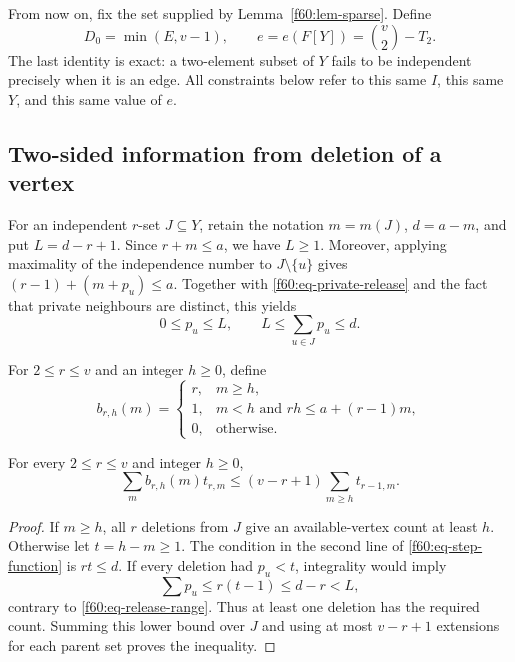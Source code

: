 From now on, fix the set supplied by Lemma~\ref{f60:lem-sparse}.  Define
\begin{equation}
 D_0=\min(E,v-1),\qquad e=e(F[Y])=\binom v2-T_2.
 \label{f60:eq-actual-edges}
\end{equation}
The last identity is exact: a two-element subset of $Y$ fails to be
independent precisely when it is an edge.  All constraints below refer
to this same $I$, this same $Y$, and this same value of $e$.

\subsection{Two-sided information from deletion of a vertex}
\label{f60:subsec-two-sided}

For an independent $r$-set $J\subseteq Y$, retain the notation
$m=m(J)$, $d=a-m$, and put $L=d-r+1$.  Since $r+m\le a$, we have
$L\ge1$.  Moreover, applying maximality of the independence number to
$J\setminus\{u\}$ gives
$(r-1)+(m+p_u)\le a$.  Together with
\eqref{f60:eq-private-release} and the fact that private neighbours are
distinct, this yields
\begin{equation}
 0\le p_u\le L,\qquad L\le\sum_{u\in J}p_u\le d.
 \label{f60:eq-release-range}
\end{equation}

For $2\le r\le v$ and an integer $h\ge0$, define
\begin{equation}
 b_{r,h}(m)=
 \begin{cases}
 r,&m\ge h,\\
 1,&m<h\text{ and }rh\le a+(r-1)m,\\
 0,&\text{otherwise}.
 \end{cases}
 \label{f60:eq-step-function}
\end{equation}

\begin{lemma}
\label{f60:lem-tail}
For every $2\le r\le v$ and integer $h\ge0$,
\begin{equation}
 \sum_m b_{r,h}(m)t_{r,m}
 \le(v-r+1)\sum_{m\ge h}t_{r-1,m}.
 \label{f60:eq-tail}
\end{equation}
\end{lemma}

\begin{proof}
If $m\ge h$, all $r$ deletions from $J$ give an available-vertex count
at least $h$.  Otherwise let $t=h-m\ge1$.  The condition in the second
line of \eqref{f60:eq-step-function} is $rt\le d$.  If every deletion
had $p_u<t$, integrality would imply
\[
 \sum p_u\le r(t-1)\le d-r<L,
\]
contrary to \eqref{f60:eq-release-range}.  Thus at least one deletion
has the required count.  Summing this lower bound over $J$ and using at
most $v-r+1$ extensions for each parent set proves the inequality.
\end{proof}


